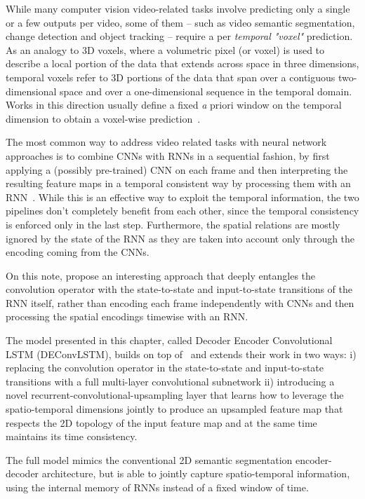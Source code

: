 While many computer vision video-related tasks involve predicting only a single
or a few outputs per video, some of them -- such as video semantic
segmentation, change detection and object tracking -- require a per
\emph{temporal "voxel"} prediction. As an analogy to 3D voxels, where a
volumetric pixel (or voxel) is used to describe a local portion of the data
that extends across space in three dimensions, temporal voxels refer to 3D
portions of the data that span over a contiguous two-dimensional space and over
a one-dimensional sequence in the temporal domain.
Works in this direction usually define a fixed {\emph a priori} window on the
temporal dimension to obtain a voxel-wise prediction~\citep{Tran16v2v}.

The most common way to address video related tasks with neural network
approaches is to combine CNNs with RNNs in a sequential fashion, by first
applying a (possibly pre-trained) CNN on each frame and then interpreting the
resulting feature maps in a temporal consistent way by processing them with an
RNN~\cite{Donahue-et-al-arxiv2014,Vinyals-et-al-CVPR2015,Karpathy+Li-CVPR2015,
Venugopalan_2015_ICCV}. While this is an effective way to exploit the temporal
information, the two pipelines don't completely benefit from each other, since
the temporal consistency is enforced only in the last step. Furthermore, the
spatial relations are mostly ignored by the state of the RNN as they are taken
into account only through the encoding coming from the CNNs.

On this note, \cite{ShiCWYWW15} propose an interesting approach that deeply
entangles the convolution operator with the state-to-state and input-to-state
transitions of the RNN itself, rather than encoding each frame independently
with CNNs and then processing the spatial encodings timewise with an RNN.

The model presented in this chapter, called Decoder Encoder Convolutional LSTM
(DEConvLSTM), builds on top of~\cite{ShiCWYWW15} and extends their work in two
ways: i) replacing the convolution operator in the state-to-state and
input-to-state transitions with a full multi-layer convolutional subnetwork ii)
introducing a novel recurrent-convolutional-upsampling layer that learns how to
leverage the spatio-temporal dimensions jointly to produce an upsampled feature
map that respects the 2D topology of the input feature map and at the same time
maintains its time consistency.

The full model mimics the conventional 2D semantic segmentation encoder-decoder
architecture, but is able to jointly capture spatio-temporal information, using
the internal memory of RNNs instead of a fixed window of time.

